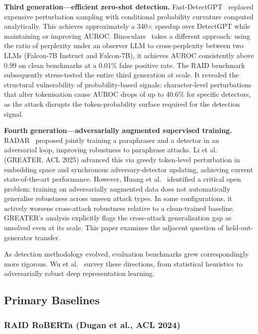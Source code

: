 \documentclass[conference]{IEEEtran}
\begin{document}
\textbf{Third generation---efficient zero-shot detection.}
Fast-DetectGPT~\cite{bao2024} replaced expensive perturbation sampling
with conditional probability curvature computed analytically. This achieves
approximately a 340$\times$ speedup over DetectGPT while maintaining or
improving AUROC. Binoculars~\cite{hans2024} takes a different approach:
using the ratio of perplexity under an observer LLM to cross-perplexity
between two LLMs (Falcon-7B Instruct and Falcon-7B), it achieves AUROC
consistently above 0.99 on clean benchmarks at a 0.01\% false positive rate.
The RAID benchmark~\cite{dugan2024} subsequently stress-tested the entire
third generation at scale. It revealed the structural vulnerability of
probability-based signals: character-level perturbations that alter tokenisation
cause AUROC drops of up to 40.6\% for specific detectors, as the attack
disrupts the token-probability surface required for the detection signal.

\textbf{Fourth generation---adversarially augmented supervised training.}
RADAR~\cite{hu2023} proposed jointly training a paraphraser and a
detector in an adversarial loop, improving robustness to paraphrase attacks.
Li et al.~\cite{li2025} (GREATER, ACL 2025) advanced this via greedy
token-level perturbation in embedding space and synchronous adversary-detector
updating, achieving current state-of-the-art performance. However, Huang et
al.~\cite{huang2024} identified a critical open problem: training on
adversarially augmented data does not automatically generalise robustness
across unseen attack types. In some configurations, it actively worsens
cross-attack robustness relative to a clean-trained baseline. GREATER's
analysis explicitly flags the cross-attack generalisation gap as unsolved
even at its scale. This paper examines the adjacent question of held-out-generator transfer.

As detection methodology evolved, evaluation benchmarks grew correspondingly
more rigorous. Wu et al.~\cite{wu2025survey} survey these directions, from
statistical heuristics to adversarially robust deep representation learning.

\subsection{Primary Baselines}

\subsubsection{RAID RoBERTa (Dugan et al., ACL 2024)}
\end{document}
